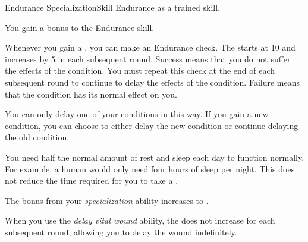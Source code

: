     \begin{feat}{Endurance Specialization}{Skill}
        \featpre Endurance as a trained skill.

         You gain a  bonus to the Endurance skill.

         Whenever you gain a , you can make an Endurance check.
        The  starts at 10 and increases by 5 in each subsequent round.
        Success means that you do not suffer the effects of the condition.
        You must repeat this check at the end of each subsequent round to continue to delay the effects of the condition.
        Failure means that the condition has its normal effect on you.

        You can only delay one of your conditions in this way.
        If you gain a new condition, you can choose to either delay the new condition or continue delaying the old condition.

         You need half the normal amount of rest and sleep each day to function normally.
        For example, a human would only need four hours of sleep per night.
        This does not reduce the time required for you to take a .

         The bonus from your \textit{specialization} ability increases to .

         When you use the \textit{delay vital wound} ability, the  does not increase for each subsequent round, allowing you to delay the wound indefinitely.
    \end{feat}

